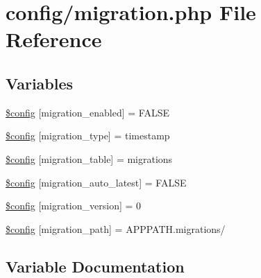 \hypertarget{application_2config_2migration_8php}{}\section{config/migration.php File Reference}
\label{application_2config_2migration_8php}
\subsection*{Variables}
\begin{DoxyCompactItemize}
\item 
\mbox{\hyperlink{application_2config_2migration_8php_a769784fcf4b9c465dd96ad7e01bf0a9f}{\$config}} \mbox{[}\textquotesingle{}migration\+\_\+enabled\textquotesingle{}\mbox{]} = F\+A\+L\+SE
\item 
\mbox{\hyperlink{application_2config_2migration_8php_a8ee76568d51cffa460c623e8d8dc3166}{\$config}} \mbox{[}\textquotesingle{}migration\+\_\+type\textquotesingle{}\mbox{]} = \textquotesingle{}timestamp\textquotesingle{}
\item 
\mbox{\hyperlink{application_2config_2migration_8php_af06715c5264f93cc01f7ee2d17cf68f6}{\$config}} \mbox{[}\textquotesingle{}migration\+\_\+table\textquotesingle{}\mbox{]} = \textquotesingle{}migrations\textquotesingle{}
\item 
\mbox{\hyperlink{application_2config_2migration_8php_ac265f0acf3f7bbdd953c5b6f91d70479}{\$config}} \mbox{[}\textquotesingle{}migration\+\_\+auto\+\_\+latest\textquotesingle{}\mbox{]} = F\+A\+L\+SE
\item 
\mbox{\hyperlink{application_2config_2migration_8php_aef268362fc4bdb038fb0b71df8bf9a94}{\$config}} \mbox{[}\textquotesingle{}migration\+\_\+version\textquotesingle{}\mbox{]} = 0
\item 
\mbox{\hyperlink{application_2config_2migration_8php_a780eb2c71713803ffac5e0ef35c11d81}{\$config}} \mbox{[}\textquotesingle{}migration\+\_\+path\textquotesingle{}\mbox{]} = A\+P\+P\+P\+A\+T\+H.\textquotesingle{}migrations/\textquotesingle{}
\end{DoxyCompactItemize}


\subsection{Variable Documentation}
\mbox{\label{application_2config_2migration_8php_a769784fcf4b9c465dd96ad7e01bf0a9f}} 
